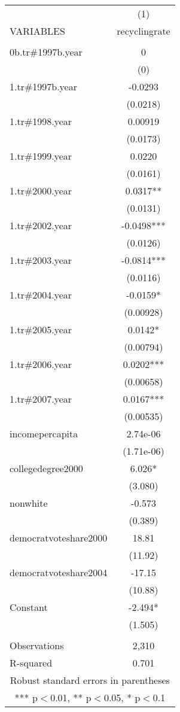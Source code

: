 \documentclass[]{article}
\begin{document}
\begin{tabular}{lc} \hline
 & (1) \\
VARIABLES & recyclingrate \\ \hline
 &  \\
0b.tr\#1997b.year & 0 \\
 & (0) \\
1.tr\#1997b.year & -0.0293 \\
 & (0.0218) \\
1.tr\#1998.year & 0.00919 \\
 & (0.0173) \\
1.tr\#1999.year & 0.0220 \\
 & (0.0161) \\
1.tr\#2000.year & 0.0317** \\
 & (0.0131) \\
1.tr\#2002.year & -0.0498*** \\
 & (0.0126) \\
1.tr\#2003.year & -0.0814*** \\
 & (0.0116) \\
1.tr\#2004.year & -0.0159* \\
 & (0.00928) \\
1.tr\#2005.year & 0.0142* \\
 & (0.00794) \\
1.tr\#2006.year & 0.0202*** \\
 & (0.00658) \\
1.tr\#2007.year & 0.0167*** \\
 & (0.00535) \\
incomepercapita & 2.74e-06 \\
 & (1.71e-06) \\
collegedegree2000 & 6.026* \\
 & (3.080) \\
nonwhite & -0.573 \\
 & (0.389) \\
democratvoteshare2000 & 18.81 \\
 & (11.92) \\
democratvoteshare2004 & -17.15 \\
 & (10.88) \\
Constant & -2.494* \\
 & (1.505) \\
 &  \\
Observations & 2,310 \\
 R-squared & 0.701 \\ \hline
\multicolumn{2}{c}{ Robust standard errors in parentheses} \\
\multicolumn{2}{c}{ *** p$<$0.01, ** p$<$0.05, * p$<$0.1} \\
\end{tabular}
\end{document}
